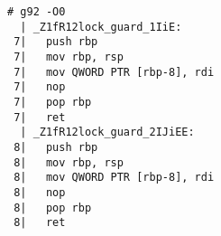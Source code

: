 \begin{lstlisting}[language={},numbers=none,title=\href{https://godbolt.org/z/rvWx8K}{\texttt{godbolt.org/z/rvWx8K}}]
# g92 -O0
  | _Z1fR12lock_guard_1IiE:
 7|   push rbp
 7|   mov rbp, rsp
 7|   mov QWORD PTR [rbp-8], rdi
 7|   nop
 7|   pop rbp
 7|   ret
  | _Z1fR12lock_guard_2IJiEE:
 8|   push rbp
 8|   mov rbp, rsp
 8|   mov QWORD PTR [rbp-8], rdi
 8|   nop
 8|   pop rbp
 8|   ret
\end{lstlisting}
